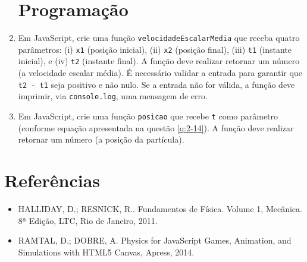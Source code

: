 \documentclass[12pt,a4paper,oneside]{article}
\begin{document}
\begin{enumerate}
\section{Programação}

	\item Em JavaScript, crie uma função {\tt velocidadeEscalarMedia} que receba quatro parâmetros: (i) {\tt x1} (posição inicial), (ii) {\tt x2} (posição final), (iii) {\tt t1} (instante inicial), e (iv) {\tt t2} (instante final). A função deve realizar retornar um número (a velocidade escalar média). É necessário validar a entrada para garantir que  {\tt t2 - t1} seja positivo e não nulo. Se a entrada não for válida, a função deve imprimir, via {\tt console.log}, uma mensagem de erro.
	
	\item Em JavaScript, crie uma função {\tt posicao} que recebe {\tt t} como parâmetro (conforme equação apresentada na questão \ref{q:2-14}). A função deve realizar retornar um número (a posição da partícula).
		
\end{enumerate}

\section{Referências}

\begin{itemize}
	\item HALLIDAY, D.; RESNICK, R.. Fundamentos de Física. Volume 1, Mecânica. 8ª Edição, LTC, Rio de Janeiro, 2011.

	\item RAMTAL, D.; DOBRE, A. Physics for JavaScript Games, Animation, and Simulations with HTML5 Canvas, Apress, 2014.
\end{itemize}
\end{document}
